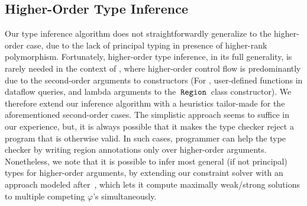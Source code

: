 
\subsection{Higher-Order Type Inference}

Our type inference algorithm does not straightforwardly generalize to
the higher-order case, due to the lack of principal typing in presence of
higher-rank polymorphism. Fortunately, higher-order type inference, in
its full generality, is rarely needed in the context of \name, where
higher-order control flow is predominantly due to the second-order
arguments to constructors (For \eg, user-defined functions in dataflow
queries, and lambda arguments to the $\,{\tt Region}\,$ class constructor). We
therefore extend our inference algorithm with a heuristics tailor-made
for the aforementioned second-order cases. The simplistic approach
seems to suffice in our experience, but, it is always possible that it
makes the type checker reject a program that is otherwise valid. In
such cases, programmer can help the type checker by writing region
annotations only over higher-order arguments.  Nonetheless, we note
that it is possible to infer most general (if not principal) types for
higher-order arguments, by extending our constraint solver with an
approach modeled after~\cite{gulwani09}, which lets it compute maximally
weak/strong solutions to multiple competing $\varphi$'s
simultaneously.

